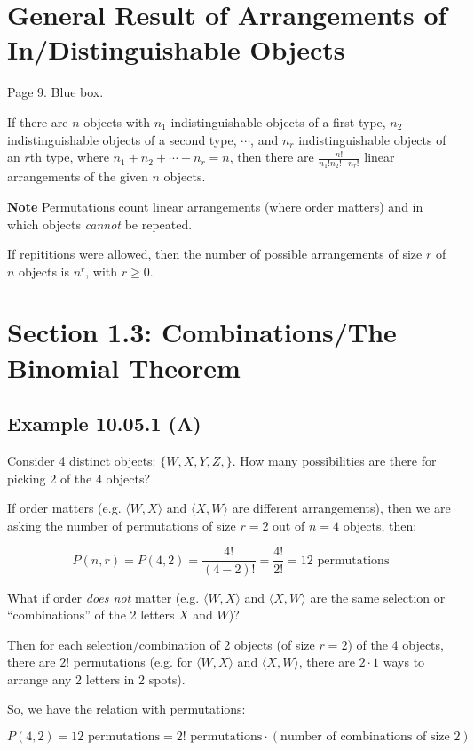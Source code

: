 \documentclass{article}
\begin{document}
\section*{General Result of Arrangements of In/Distinguishable Objects}

Page 9. Blue box.

If there are $n$ objects with $n_1$ indistinguishable objects of a
first type, $n_2$ indistinguishable objects of a second type,
$\cdots$, and $n_r$ indistinguishable objects of an $r$th type, where
$n_1+n_2+\cdots+n_r=n$, then there are
$\frac{n!}{n_1!n_2!\cdots{}n_r!}$ linear arrangements of the given $n$
objects.

\textbf{Note} Permutations count linear arrangements (where order
matters) and in which objects \textit{cannot} be repeated.

If repititions were allowed, then the number of possible arrangements
of size $r$ of $n$ objects is $n^r$, with $r\ge0$.

\section*{Section 1.3: Combinations/The Binomial Theorem}

\subsection{Example 10.05.1 (A)}

Consider 4 distinct objects: $\{W,X,Y,Z,\}$. How many possibilities
are there for picking 2 of the 4 objects?

If order matters (e.g. $\langle{}W,X\rangle$ and $\langle{}X,W\rangle$
are different arrangements), then we are asking the number of
permutations of size $r=2$ out of $n=4$ objects, then:

\[
P(n,r)=P(4,2)=\frac{4!}{(4-2)!}=\frac{4!}{2!}=12\text{ permutations}
\]

What if order \textit{does not} matter (e.g. $\langle{}W,X\rangle$ and
$\langle{}X,W\rangle$ are the same selection or ``combinations'' of
the 2 letters $X$ and $W$)?

Then for each selection/combination of 2 objects (of size $r=2$) of
the 4 objects, there are $2!$ permutations (e.g. for
$\langle{}W,X\rangle$ and $\langle{}X,W\rangle$, there are $2\cdot1$
ways to arrange any 2 letters in 2 spots).

So, we have the relation with permutations:

\[
P(4,2)=12\text{ permutations}=2!\text{ permutations}\cdot(\text{number of combinations of size $2$})
\]
\end{document}

